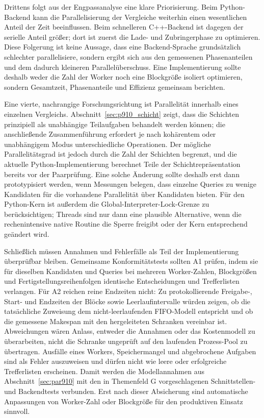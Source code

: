 \documentclass[a4paper,12pt, twoside]{report}
\theoremstyle{definition}
\begin{document}
Drittens folgt aus der Engpassanalyse eine klare Priorisierung. Beim Python-Backend kann die Parallelisierung der Vergleiche weiterhin einen wesentlichen Anteil der Zeit beeinflussen. Beim schnelleren C++-Backend ist dagegen der serielle Anteil größer; dort ist zuerst die Lade- und Zubringerphase zu optimieren. Diese Folgerung ist keine Aussage, dass eine Backend-Sprache grundsätzlich schlechter parallelisiere, sondern ergibt sich aus den gemessenen Phasenanteilen und dem dadurch kleineren Parallelüberschuss. Eine Implementierung sollte deshalb weder die Zahl der Worker noch eine Blockgröße isoliert optimieren, sondern Gesamtzeit, Phasenanteile und Effizienz gemeinsam berichten.

Eine vierte, nachrangige Forschungsrichtung ist Parallelität innerhalb eines einzelnen Vergleichs. Abschnitt~\ref{sec:p910_schicht} zeigt, dass die Schichten prinzipiell als unabhängige Teilaufgaben behandelt werden können; die anschließende Zusammenführung erfordert je nach kohärentem oder unabhängigem Modus unterschiedliche Operationen. Der mögliche Parallelitätsgrad ist jedoch durch die Zahl der Schichten begrenzt, und die aktuelle Python-Implementierung berechnet Teile der Schichtrepräsentation bereits vor der Paarprüfung. Eine solche Änderung sollte deshalb erst dann prototypisiert werden, wenn Messungen belegen, dass einzelne Queries zu wenige Kandidaten für die vorhandene Parallelität über Kandidaten bieten. Für den Python-Kern ist außerdem die Global-Interpreter-Lock-Grenze zu berücksichtigen; Threads sind nur dann eine plausible Alternative, wenn die rechenintensive native Routine die Sperre freigibt oder der Kern entsprechend geändert wird.

Schließlich müssen Annahmen und Fehlerfälle als Teil der Implementierung überprüfbar bleiben. Gemeinsame Konformitätstests sollten A1 prüfen, indem sie für dieselben Kandidaten und Queries bei mehreren Worker-Zahlen, Blockgrößen und Fertigstellungsreihenfolgen identische Entscheidungen und Trefferlisten verlangen. Für A2 reichen reine Endzeiten nicht: Zu protokollierende Freigabe-, Start- und Endzeiten der Blöcke sowie Leerlaufintervalle würden zeigen, ob die tatsächliche Zuweisung dem nicht-leerlaufenden FIFO-Modell entspricht und ob die gemessene Makespan mit den hergeleiteten Schranken vereinbar ist. Abweichungen wären Anlass, entweder die Annahmen oder das Kostenmodell zu überarbeiten, nicht die Schranke ungeprüft auf den laufenden Prozess-Pool zu übertragen. Ausfälle eines Workers, Speichermangel und abgebrochene Aufgaben sind als Fehler auszuweisen und dürfen nicht wie leere oder erfolgreiche Trefferlisten erscheinen. Damit werden die Modellannahmen aus Abschnitt~\ref{sec:par910} mit den in Themenfeld G vorgeschlagenen Schnittstellen- und Backendtests verbunden. Erst nach dieser Absicherung sind automatische Anpassungen von Worker-Zahl oder Blockgröße für den produktiven Einsatz sinnvoll.
\end{document}
